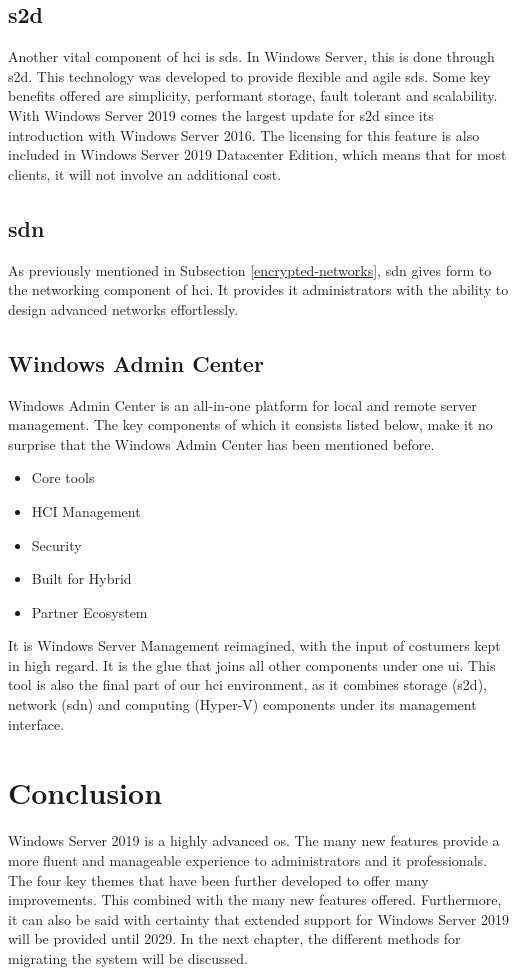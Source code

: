 \subsection{\acrfull{s2d}}
Another vital component of \acrshort{hci} is \acrfull{sds}. In Windows Server, this is done through \acrshort{s2d}. This technology was developed to provide flexible and agile \acrshort{sds}. Some key benefits offered are simplicity, performant storage, fault tolerant and scalability. With Windows Server 2019 comes the largest update for \acrshort{s2d} since its introduction with Windows Server 2016. The licensing for this feature is also included in Windows Server 2019 Datacenter Edition, which means that for most clients, it will not involve an additional cost. \autocite{Gerend2018a}
\subsection{\acrshort{sdn}}
As previously mentioned in Subsection \ref{encrypted-networks}, \acrshort{sdn} gives form to the networking component of \acrshort{hci}. It provides \acrshort{it} administrators with the ability to design advanced networks effortlessly.
\subsection{Windows Admin Center}
Windows Admin Center is an all-in-one platform for local and remote server management. The key components of which it consists listed below, make it no surprise that the Windows Admin Center has been mentioned before. 
\begin{itemize}
	\item Core tools
	\item HCI Management
	\item Security
	\item Built for Hybrid
	\item Partner Ecosystem
\end{itemize}
It is Windows Server Management reimagined, with the input of costumers kept in high regard. It is the glue that joins all other components under one \acrfull{ui}. This tool is also the final part of our \acrshort{hci} environment, as it combines storage (\acrshort{s2d}), network (\acrshort{sdn}) and computing (Hyper-V) components under its management interface. 

\section{Conclusion}

Windows Server 2019 is a highly advanced \acrshort{os}. The many new features provide a more fluent and manageable experience to administrators and \acrshort{it} professionals. The four key themes that have been further developed to offer many improvements. This combined with the many new features offered. Furthermore, it can also be said with certainty that extended support for Windows Server 2019 will be provided until 2029. In the next chapter, the different methods for migrating the system will be discussed.
